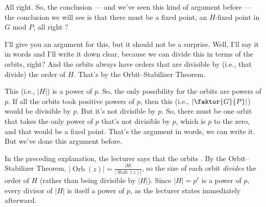 \begin{proofWrapper}
\begin{speech}[00:23:47 - 00:25:07]
All right. So, the conclusion --- and we've seen this kind of argument before --- the conclusion we will see is that there must be a fixed point, an $H$-fixed point in $G$ mod $P$, all right ?

I'll give you an argument for this, but it should not be a surprise. Well, I'll say it in words and I'll write it down clear, because we can divide this  in terms of the orbits, right? And the orbits always have orders that are divisible by (i.e., that divide) the order of $H$. That's by the Orbit--Stabilizer Theorem.

This (i.e., $|H|$) is a power of $p$. So, the only possibility for the orbits are powers of $p$. If all the orbits took positive powers of $p$, then this (i.e., $\left|\faktor{G}{P}\right|$) would be divisible by $p$. But it's not divisible by $p$. So, there must be one orbit that takes the only power of $p$ that's not divisible by $p$, which is $p$ to the zero, and that would be a fixed point. That's the argument in words, we can write it. But we've done this argument before. 
\end{speech}

\begin{content}
\end{content}

\begin{aiNote}
In the preceding explanation, the lecturer says that the orbits . By the Orbit--Stabilizer Theorem, $|\operatorname{Orb}(z)| = \frac{|H|}{|\operatorname{Stab}(z)|}$, so the size of each orbit \emph{divides} the order of $H$ (rather than being divisible by $|H|$). Since $|H| = p^\ell$ is a power of $p$, every divisor of $|H|$ is itself a power of $p$, as the lecturer states immediately afterward.
\end{aiNote}


\end{proofWrapper}
